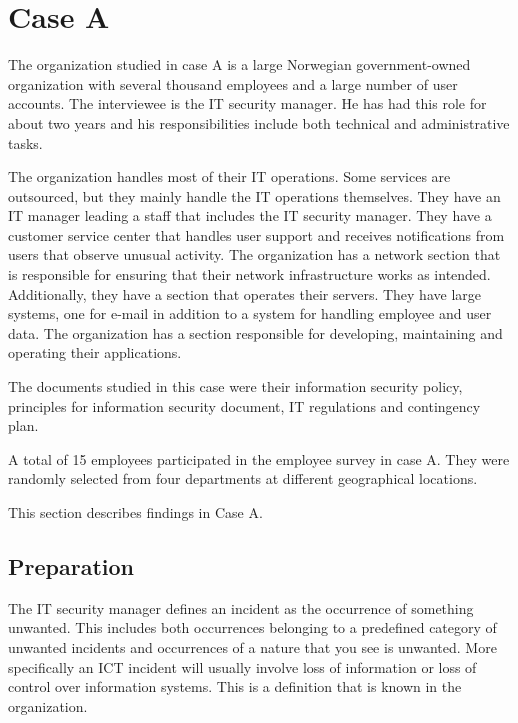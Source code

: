\documentclass[b5paper, twoside, openright, 11pt]{report}
\begin{document}


\section{Case A}
The organization studied in case A is a large Norwegian government-owned organization with several thousand employees and a large number of user accounts. The interviewee is the IT security manager. He has had this role for about two years and his responsibilities include both technical and administrative tasks. 

The organization handles most of their IT operations. Some services are outsourced, but they mainly handle the IT operations themselves. They have an IT manager leading a staff that includes the IT security manager. They have a customer service center that handles user support and receives notifications from users that observe unusual activity. The organization has a network section that is responsible for ensuring that their network infrastructure works as intended. Additionally, they have a section that operates their servers. They have large systems, one for e-mail in addition to a system for handling employee and user data. The organization has a section responsible for developing, maintaining and operating their applications.

The documents studied in this case were their information security policy, principles for information security document, IT regulations and contingency plan.

A total of 15 employees participated in the employee survey in case A. They were randomly selected from four departments at different geographical locations. 

This section describes findings in Case A. 

\subsection{Preparation}
The IT security manager defines an incident %
as the occurrence of something unwanted. This includes both occurrences belonging to a predefined category of unwanted incidents and occurrences of a nature that you see is unwanted. More specifically an \ac{ICT} incident will usually involve loss of information or loss of control over information systems. This is a definition that is known in the organization. 
\end{document}
